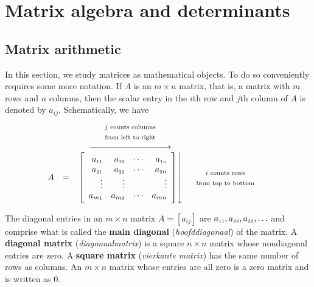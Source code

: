 \chapter{Matrix algebra and determinants}
\label{chap_matrices_det}
\graphicspath{{figures/Matrix_det/}}



\section{Matrix arithmetic}
In this section, we study matrices as mathematical objects.  To do so conveniently requires some more notation. 
If $A$ is an $m \times n$ matrix, that is, a matrix with $m$ rows and $n$ columns, then the scalar entry in the $i$th row and $j$th column of $A$ is denoted by $a_{ij}$. Schematically, we have
\[ \begin{array}{ccccc} 
&  &  \text{\begin{tabular}{c} \scriptsize {$j$} counts columns \\ \scriptsize from left to right \end{tabular}} &  & \\  &  & \xrightarrow{\hspace{1.25in}} & & \\
A & = & \left. \left[ \begin{array}{rrrr} a_{\mbox{\tiny$1$} \mbox{\tiny$1$}} & a_{\mbox{\tiny$1$} \mbox{\tiny$2$}} & \cdots & a_{\mbox{\tiny$1$} \mbox{\tiny$n$}} \\ a_{\mbox{\tiny$2$} \mbox{\tiny$1$}} & a_{\mbox{\tiny$2$} \mbox{\tiny$2$}} & \cdots & a_{\mbox{\tiny$2$} n} \\ \vdots & \vdots  & & \vdots \\ a_{m \mbox{\tiny$1$}} & a_{m \mbox{\tiny$2$}} & \cdots & a_{m n} \end{array}  \right] \right\downarrow & \text{\begin{tabular}{c} \scriptsize {$i$} counts rows \\ \scriptsize from top to bottom \end{tabular}} \end{array} \] 

\label{maindiagonal} The diagonal entries in an $m \times n$ matrix $A=[a_{ij}]$ are $a_{\mbox{\tiny$11$}} , a_{\mbox{\tiny$22$}} , a_{\mbox{\tiny$33$}} , \ldots$ and comprise what is called the \textbf{main diagonal} (\textit{hoofddiagonaal}) of the matrix.  A \textbf{diagonal matrix} (\textit{diagonaalmatrix}) is a square $n \times n$ matrix whose nondiagonal entries are zero. A \textbf{square matrix} (\textit{vierkante matrix}) has the same number of rows as columns.  An $m \times n$ matrix whose entries are all zero is a zero matrix and is written as 0. \\


